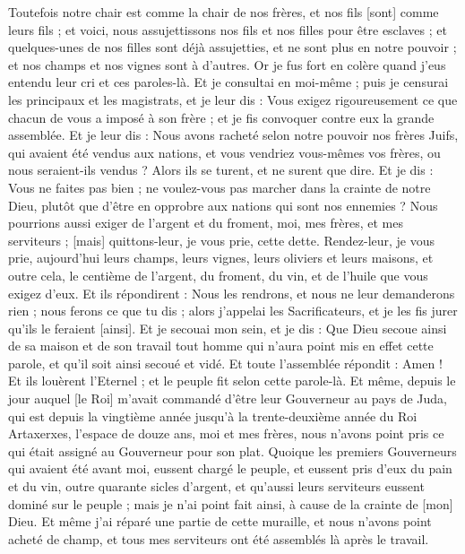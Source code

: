 \begin{multicols}{2}
Toutefois notre chair est comme la chair de nos frères, et nos fils [sont] comme leurs fils ; et voici, nous assujettissons nos fils et nos filles pour être esclaves ; et quelques-unes de nos filles sont déjà assujetties, et ne sont plus en notre pouvoir ; et nos champs et nos vignes sont à d'autres.
Or je fus fort en colère quand j'eus entendu leur cri et ces paroles-là.
Et je consultai en moi-même ; puis je censurai les principaux et les magistrats, et je leur dis : Vous exigez rigoureusement ce que chacun de vous a imposé à son frère ; et je fis convoquer contre eux la grande assemblée.
Et je leur dis : Nous avons racheté selon notre pouvoir nos frères Juifs, qui avaient été vendus aux nations, et vous vendriez vous-mêmes vos frères, ou nous seraient-ils vendus ? Alors ils se turent, et ne surent que dire.
Et je dis : Vous ne faites pas bien ; ne voulez-vous pas marcher dans la crainte de notre Dieu, plutôt que d'être en opprobre aux nations qui sont nos ennemies ?
Nous pourrions aussi exiger de l'argent et du froment, moi, mes frères, et mes serviteurs ; [mais] quittons-leur, je vous prie, cette dette.
Rendez-leur, je vous prie, aujourd'hui leurs champs, leurs vignes, leurs oliviers et leurs maisons, et outre cela, le centième de l'argent, du froment, du vin, et de l'huile que vous exigez d'eux.
Et ils répondirent : Nous les rendrons, et nous ne leur demanderons rien ; nous ferons ce que tu dis ; alors j'appelai les Sacrificateurs, et je les fis jurer qu'ils le feraient [ainsi].
Et je secouai mon sein, et je dis : Que Dieu secoue ainsi de sa maison et de son travail tout homme qui n'aura point mis en effet cette parole, et qu'il soit ainsi secoué et vidé. Et toute l'assemblée répondit : Amen ! Et ils louèrent l'Eternel ; et le peuple fit selon cette parole-là.
Et même, depuis le jour auquel [le Roi] m'avait commandé d'être leur Gouverneur au pays de Juda, qui est depuis la vingtième année jusqu'à la trente-deuxième année du Roi Artaxerxes, l'espace de douze ans, moi et mes frères, nous n'avons point pris ce qui était assigné au Gouverneur pour son plat.
Quoique les premiers Gouverneurs qui avaient été avant moi, eussent chargé le peuple, et eussent pris d'eux du pain et du vin, outre quarante sicles d'argent, et qu'aussi leurs serviteurs eussent dominé sur le peuple ; mais je n'ai point fait ainsi, à cause de la crainte de [mon] Dieu.
Et même j'ai réparé une partie de cette muraille, et nous n'avons point acheté de champ, et tous mes serviteurs ont été assemblés là après le travail.

\end{multicols}
